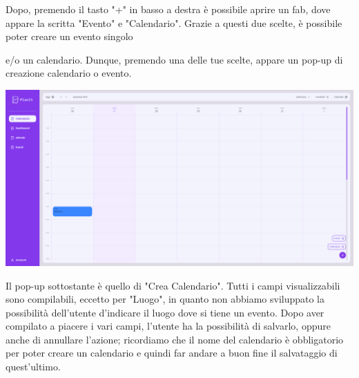 Dopo, premendo il tasto "+" in basso a destra è possibile aprire un fab, dove appare la scritta "Evento" e "Calendario". Grazie a questi due scelte, è possibile poter creare un evento singolo

e/o un calendario. Dunque, premendo una delle tue scelte, appare un pop-up di creazione calendario o evento.

\begin{center}
    \includegraphics[width=1\textwidth, height=0.3\textheight]{img/png/FrontEnd/Calendario/calendario_creazione.png}
\end{center}

Il pop-up sottostante è quello di "Crea Calendario". Tutti i campi visualizzabili sono compilabili, eccetto per "Luogo", in quanto non abbiamo sviluppato la possibilità dell'utente d'indicare il luogo dove si tiene un evento. Dopo aver compilato a piacere i vari campi, l'utente ha la possibilità di salvarlo, oppure anche di annullare l'azione; ricordiamo che il nome del calendario è obbligatorio per poter creare un calendario e quindi far andare a buon fine il salvataggio di quest'ultimo.

